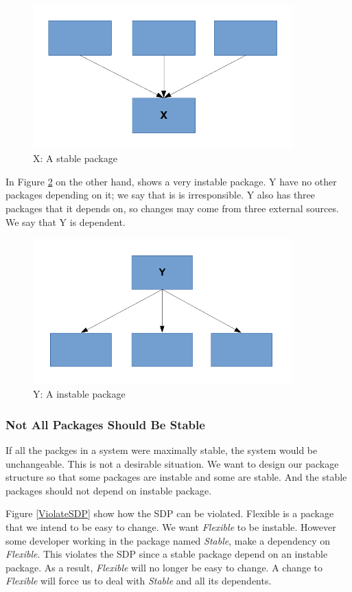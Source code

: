 \documentclass[12pt]{report}
\begin{document}
\begin{figure}[H]
    \centering
    \includegraphics[width=10cm]{uml/Stable.png}
    \caption{X: A stable package}
    \label{Stable}
\end{figure}

In Figure \ref{Instable} on the other hand, shows a very instable package. 
Y have no other packages depending on it; we say that is is irresponsible.
Y also has three packages that it depends on, so changes may come from 
three external sources. We say that Y is dependent.

\begin{figure}[H]
    \centering
    \includegraphics[width=10cm]{uml/Instable.png}
    \caption{Y: A instable package}
    \label{Instable}
\end{figure}

\subsubsection{Not All Packages Should Be Stable}
If all the packges in a system were maximally stable, the system would 
be unchangeable. This is not a desirable situation. 
We want to design our package structure so that some packages are instable 
and some are stable. And the stable packages should not 
depend on instable package. 

Figure \ref{ViolateSDP} show how the SDP can be violated. 
Flexible is a package that we intend to be easy to change. 
We want \textit{Flexible} to be instable. However some developer working in the 
package named \textit{Stable}, make a dependency on \textit{Flexible}. 
This violates the SDP since a stable package depend on an instable package.
As a result, \textit{Flexible} will no longer be easy to change. 
A change to \textit{Flexible} will force us to deal with \textit{Stable} and all its dependents.
\end{document}
